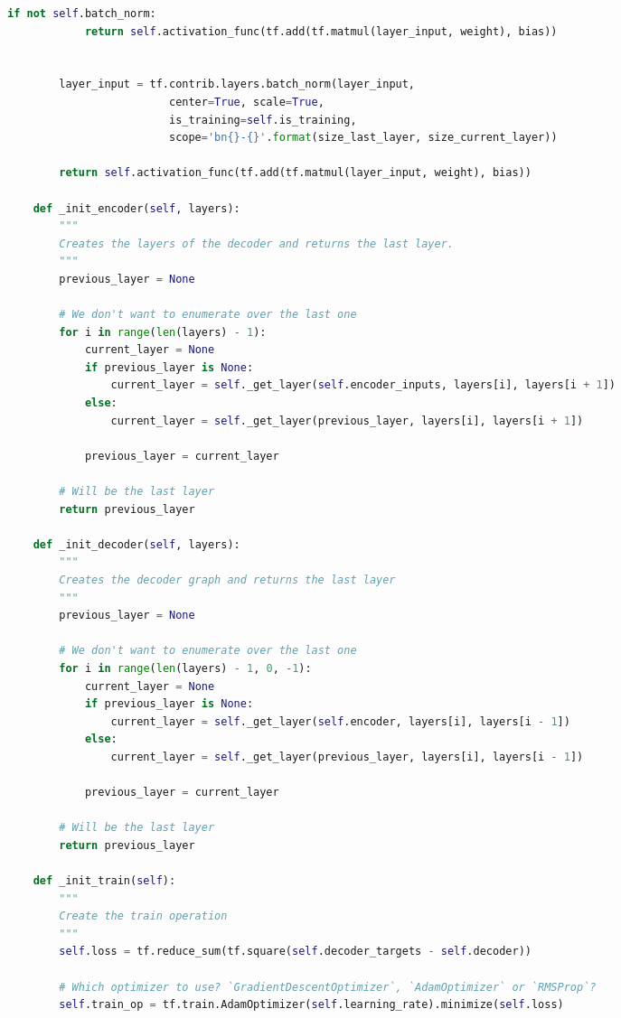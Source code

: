 \begin{landscape}
\begin{multicols}{2}
\begin{lstlisting}[language=Python]
        if not self.batch_norm:
            return self.activation_func(tf.add(tf.matmul(layer_input, weight), bias))


        layer_input = tf.contrib.layers.batch_norm(layer_input,
                         center=True, scale=True,
                         is_training=self.is_training,
                         scope='bn{}-{}'.format(size_last_layer, size_current_layer))

        return self.activation_func(tf.add(tf.matmul(layer_input, weight), bias))

    def _init_encoder(self, layers):
        """
        Creates the layers of the decoder and returns the last layer.
        """
        previous_layer = None

        # We don't want to enumerate over the last one
        for i in range(len(layers) - 1):
            current_layer = None
            if previous_layer is None:
                current_layer = self._get_layer(self.encoder_inputs, layers[i], layers[i + 1])
            else:
                current_layer = self._get_layer(previous_layer, layers[i], layers[i + 1])

            previous_layer = current_layer

        # Will be the last layer
        return previous_layer

    def _init_decoder(self, layers):
        """
        Creates the decoder graph and returns the last layer
        """
        previous_layer = None

        # We don't want to enumerate over the last one
        for i in range(len(layers) - 1, 0, -1):
            current_layer = None
            if previous_layer is None:
                current_layer = self._get_layer(self.encoder, layers[i], layers[i - 1])
            else:
                current_layer = self._get_layer(previous_layer, layers[i], layers[i - 1])

            previous_layer = current_layer

        # Will be the last layer
        return previous_layer

    def _init_train(self):
        """
        Create the train operation
        """
        self.loss = tf.reduce_sum(tf.square(self.decoder_targets - self.decoder))

        # Which optimizer to use? `GradientDescentOptimizer`, `AdamOptimizer` or `RMSProp`?
        self.train_op = tf.train.AdamOptimizer(self.learning_rate).minimize(self.loss)


\end{lstlisting}
\end{multicols}
\end{landscape}
